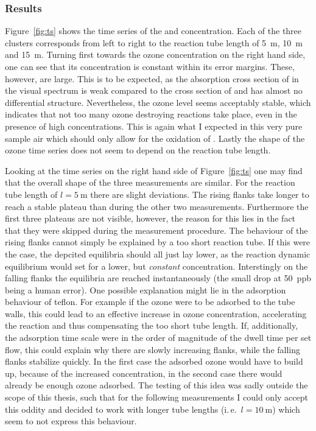 \subsubsection{Results}
\label{sec:no-results}

Figure~\ref{fig:ts} shows the time series of the  and 
concentration. Each of the three clusters corresponds from left to
right to the reaction tube length of \SI{5}{\meter}, \SI{10}{\meter}
and \SI{15}{\meter}. Turning first towards the ozone concentration on
the right hand side, one can see that its concentration is constant within
its error margins. These, however, are large. This is to be expected,
as the absorption cross section of  in the visual spectrum is
weak compared to the cross section of  and has almost no
differential structure. Nevertheless, the ozone level seems acceptably
stable, which indicates that not too many ozone destroying reactions
take place, even in the presence of high  concentrations. This
is again what I expected in this very pure sample air which should
only allow for the oxidation of . Lastly the shape of the ozone
time series does not seem to depend on the reaction tube length.

Looking at the  time series on the right hand side of
Figure~\ref{fig:ts} one may find that the overall shape of the three
measurements are similar. For the reaction tube length of
$l= \SI{5}{\meter}$ there are slight deviations. The rising flanks take
longer to reach a stable plateau than during the other two
measurements. Furthermore the first three plateaus are not visible,
however, the reason for this lies in the fact that they were skipped
during the measurement procedure. The behaviour of the rising flanks
cannot simply be explained by a too short reaction tube. If this were
the case, the depcited equilibria should all just lay lower, as the
reaction dynamic equilibrium would set for a lower, but
\emph{constant}  concentration. Interstingly on the falling
flanks the equilibria are reached instantaneously (the small drop at
\SI{50}{ppb} being a human error). One possible explanation might lie
in the adsorption behaviour of teflon. For example if the ozone were
to be adsorbed to the tube walls, this could lead to an effective
increase in ozone concentration, accelerating the reaction and thus
compensating the too short tube length. If, additionally, the
adsorption time scale were in the order of magnitude of the dwell time
per set flow, this could explain why there are slowly increasing flanks,
while the falling flanks stabilize quickly. In the first case the
adsorbed ozone would have to build up, because of the increased
concentration, in the second case there would already be enough ozone
adsorbed. The testing of this idea was sadly outside the scope of this
thesis, such that for the following measurements I could only accept
this oddity and decided to work with longer tube lengths
(i.\,e.~$l = \SI{10}{\meter}$) which seem to not express this
behaviour.


